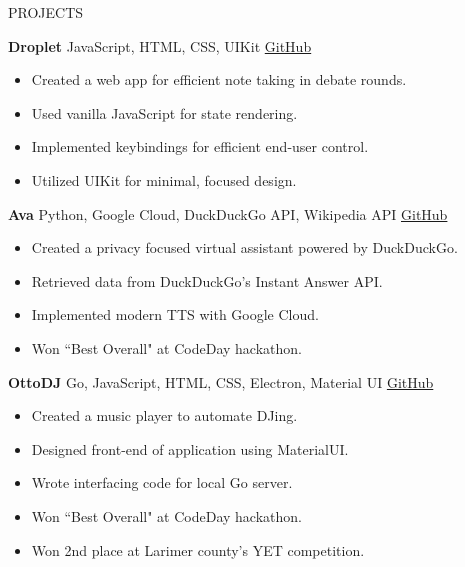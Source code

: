 \documentclass{resume} %
\begin{document}
\begin{rSection}{PROJECTS}
\vspace{-1.25em}
\item \textbf{Droplet} {JavaScript, HTML, CSS, UIKit} \hfill \href{https://github.com/iandraves/Droplet}{GitHub}
\begin{itemize}
    \itemsep -3pt {} 
    \item Created a web app for efficient note taking in debate rounds.
    \item Used vanilla JavaScript for state rendering.
   \item Implemented keybindings for efficient end-user control.
   \item Utilized UIKit for minimal, focused design.
 \end{itemize}
 \item \textbf{Ava} {Python, Google Cloud, DuckDuckGo API, Wikipedia API} \hfill \href{https://github.com/Ember-ORG/Ava}{GitHub}
\begin{itemize}
    \itemsep -3pt {} 
     \item Created a privacy focused virtual assistant powered by DuckDuckGo.
     \item Retrieved data from DuckDuckGo's Instant Answer API.
    \item Implemented modern TTS with Google Cloud.
    \item Won ``Best Overall" at CodeDay hackathon.
 \end{itemize}
\item \textbf{OttoDJ} {Go, JavaScript, HTML, CSS, Electron, Material UI} \hfill \href{https://github.com/Ember-ORG/OttoDJ}{GitHub}
\begin{itemize}
    \itemsep -3pt {} 
     \item Created a music player to automate DJing.
     \item Designed front-end of application using MaterialUI.
    \item Wrote interfacing code for local Go server.
    \item Won ``Best Overall" at CodeDay hackathon.
    \item Won 2nd place at Larimer county's YET competition.
 \end{itemize}
\end{rSection} 
\end{document}
